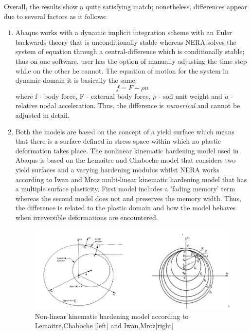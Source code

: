	Overall, the results show a quite satisfying match; nonetheless, differences appear due to several factors as it follows:
	\begin{enumerate}
		\item Abaqus works with a dynamic implicit integration scheme with an Euler backwards theory that is unconditionally stable whereas NERA solves the system of equation through a central-difference which is conditionally stable; thus on one software, user has the option of manually adjusting the time step while on the other he cannot. The equation of motion for the system in dynamic domain it is basically the same:
		\begin{equation}
		f=F-\rho\ddot{u}
		\end{equation}
		where f - body force, F - external body force, $\rho$ - soil unit weight and $\ddot{u}$ - relative nodal acceleration. Thus, the difference is \textit{numerical} and cannot be adjusted in detail.
		\item Both the models are based on the concept of a yield surface which means that there is a surface defined in stress space within which no plastic deformation takes place. The nonlinear kinematic hardening model used in Abaqus is based on the Lemaitre and Chaboche model that considers two yield surfaces and a varying hardening modulus whilst NERA works according to Iwan and Mroz multi-linear kinematic hardening model that has a multiple surface plasticity. First model includes a 'fading memory' term whereas the second model does not and preserves the memory width. Thus, the difference is related to the plastic domain and how the model behaves when irreversible deformations are encountered. 
		\begin{figure}
			\centering
			\includegraphics[width=0.7\linewidth]{"yield_srf"}
			\caption{Non-linear kinematic hardening model according to Lemaitre,Chaboche [left] and Iwan,Mroz[right]}
			\label{Yield}
		\end{figure}

\end{enumerate}
